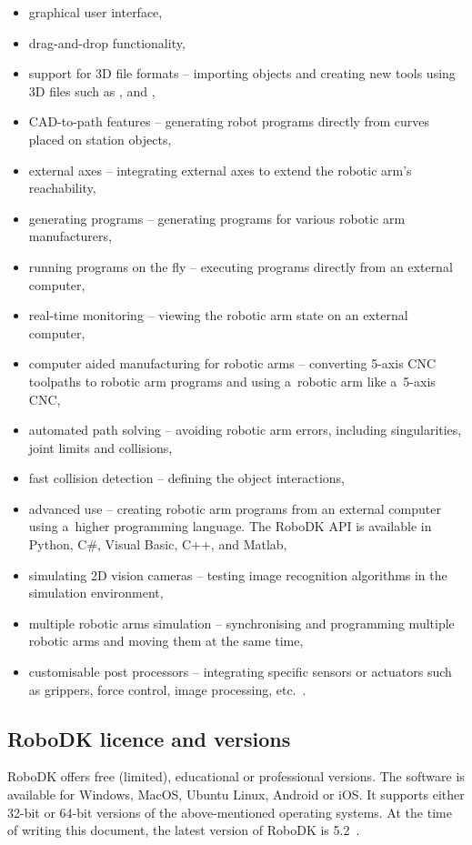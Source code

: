 \begin{itemize}
\item graphical user interface,
\item drag-and-drop functionality, 
\item support for 3D file formats -- importing objects and creating new tools using 3D files such as ,  and ,
\item CAD-to-path features -- generating robot programs directly from curves placed on station objects,
\item external axes -- integrating external axes to extend the robotic arm’s reachability,
\item generating programs -- generating programs for various robotic arm manufacturers,
\item running programs on the fly -- executing programs directly from an external computer,
\item real-time monitoring -- viewing the robotic arm state on an external computer,
\item computer aided manufacturing for robotic arms -- converting 5-axis CNC toolpaths to robotic arm programs and using a~robotic arm like a~5-axis CNC,
\item automated path solving -- avoiding robotic arm errors, including singularities, joint limits and collisions,
\item fast collision detection -- defining the object interactions, 
\item advanced use -- creating robotic arm programs from an external computer using a~higher programming language. The RoboDK API is available in Python, C\#, Visual Basic, C++, and Matlab,
\item simulating 2D vision cameras -- testing image recognition algorithms in the simulation environment,
\item multiple robotic arms simulation -- synchronising and programming multiple robotic arms and moving them at the same time, 
\item customisable post processors -- integrating specific sensors or actuators such as grippers, force control, image processing, etc.~\cite{robodkfeatures}.
\end{itemize}

\subsection{RoboDK licence and versions}

RoboDK offers free (limited), educational or professional versions. 
The software is available for Windows, MacOS, Ubuntu Linux, Android or iOS. It supports either 32-bit or 64-bit versions of the above-mentioned operating systems. At the time of writing this document, the latest version of RoboDK is 5.2~\cite{robodkversions}. 

